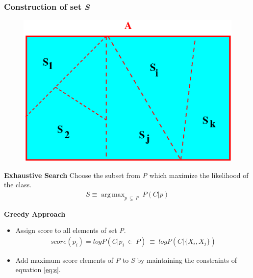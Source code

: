 \documentclass[10pt, blue,subsection=true, compress]{beamer}
\DeclareMathOperator*{\argmax}{arg\,max}
\begin{document}
\begin{frame}\frametitle{Construction of set \textit{S}}
\begin{figure}[htbp]
\centering
\includegraphics[scale=0.2]{img/s.eps}
\end{figure}
\begin{block}{\textbf{Exhaustive Search}}
Choose the subset from \textit{P} which maximize the likelihood of the class.
\begin{align}
S \equiv \argmax_{p ~ \subsetneq ~ P} ~  P(C | p)
\end{align}
\end{block}

\begin{block}{\textbf{Greedy Approach}}
\begin{itemize}
\item Assign score to all elements of set \textit{P}.
\begin{align}
 score(p_i) = log P( C | p_i ~\in~ P) ~\equiv ~ log P( C | \{X_i,X_j\}) 
\end{align}
\item Add maximum score elements of \textit{P} to \textit{S} by maintaining the constraints of equation \eqref{eq:s}.
\end{itemize}
\end{block}
\end{frame}
\end{document}
